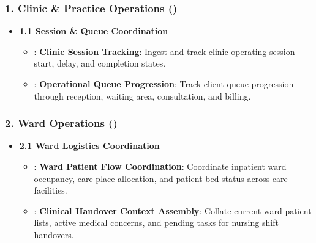 \subsubsection*{1. Clinic \& Practice Operations (\texttt{})}
\label{rad:enabling:482}

\begin{itemize}

\item 
\textbf{1.1 Session \& Queue Coordination}


\begin{itemize}

\item 
\texttt{}: \textbf{Clinic Session Tracking}: Ingest and track clinic operating session start, delay, and completion states.



\item 
\texttt{}: \textbf{Operational Queue Progression}: Track client queue progression through reception, waiting area, consultation, and billing.



\end{itemize}


\end{itemize}
\label{rad:enabling:486}
\subsubsection*{2. Ward Operations (\texttt{})}
\label{rad:enabling:487}

\begin{itemize}

\item 
\textbf{2.1 Ward Logistics Coordination}


\begin{itemize}

\item 
\texttt{}: \textbf{Ward Patient Flow Coordination}: Coordinate inpatient ward occupancy, care-place allocation, and patient bed status across care facilities.



\item 
\texttt{}: \textbf{Clinical Handover Context Assembly}: Collate current ward patient lists, active medical concerns, and pending tasks for nursing shift handovers.



\end{itemize}


\end{itemize}
\label{rad:enabling:491}
